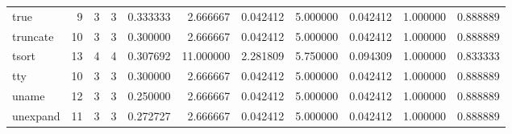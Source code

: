 \begin{longtable}{lrrrrrrrrrr}
true      &                                       9 &                  3 &                                 3 &                                   0.333333 &                               2.666667 &                                     0.042412 &                          5.000000 &                                0.042412 &                           1.000000 &                                           0.888889 \\
truncate  &                                      10 &                  3 &                                 3 &                                   0.300000 &                               2.666667 &                                     0.042412 &                          5.000000 &                                0.042412 &                           1.000000 &                                           0.888889 \\
tsort     &                                      13 &                  4 &                                 4 &                                   0.307692 &                              11.000000 &                                     2.281809 &                          5.750000 &                                0.094309 &                           1.000000 &                                           0.833333 \\
tty       &                                      10 &                  3 &                                 3 &                                   0.300000 &                               2.666667 &                                     0.042412 &                          5.000000 &                                0.042412 &                           1.000000 &                                           0.888889 \\
uname     &                                      12 &                  3 &                                 3 &                                   0.250000 &                               2.666667 &                                     0.042412 &                          5.000000 &                                0.042412 &                           1.000000 &                                           0.888889 \\
unexpand  &                                      11 &                  3 &                                 3 &                                   0.272727 &                               2.666667 &                                     0.042412 &                          5.000000 &                                0.042412 &                           1.000000 &                                           0.888889 \\

\end{longtable}
